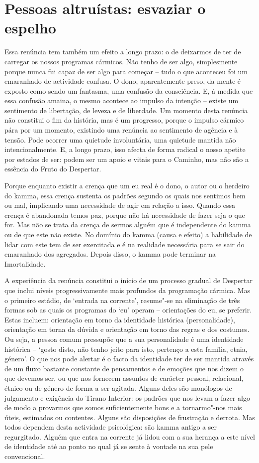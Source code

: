 \section{Pessoas altruístas: esvaziar o espelho}

Essa renúncia tem também um efeito a longo prazo: o de deixarmos de ter de carregar os nossos programas cármicos. Não tenho de ser algo, simplesmente porque nunca fui capaz de ser algo para começar -- tudo o que aconteceu foi um emaranhado de actividade confusa. O dono, aparentemente preso, da mente é exposto como sendo um fantasma, uma confusão da consciência. E, à medida que essa confusão amaina, o mesmo acontece ao impulso da intenção -- existe um sentimento de libertação, de leveza e de liberdade. Um momento desta renúncia não constitui o fim da história, mas é um progresso, porque o impulso cármico pára por um momento, existindo uma renúncia ao sentimento de agência e à tensão. Pode ocorrer uma quietude involuntária, uma quietude mantida não intencionalmente. E, a longo prazo, isso afecta de forma radical o nosso apetite por estados de ser: podem ser um apoio e vitais para o Caminho, mas não são a essência do Fruto do Despertar.

Porque enquanto existir a crença que um eu real é o dono, o autor ou o herdeiro do kamma, essa crença sustenta os padrões segundo os quais nos sentimos bem ou mal, implicando uma necessidade de agir em relação a isso. Quando essa crença é abandonada temos paz, porque não há necessidade de fazer seja o que for. Mas não se trata da crença de sermos alguém que é independente do kamma ou de que este não existe. No domínio do kamma (causa e efeito) a habilidade de lidar com este tem de ser exercitada e é na realidade necessária para se sair do emaranhado dos agregados. Depois disso, o kamma pode terminar na Imortalidade.

A experiência da renúncia constitui o início de um processo gradual de Despertar que inclui níveis progressivamente mais profundos da programação cármica. Mas o primeiro estádio, de `entrada na corrente', resume"-se na eliminação de três formas sob as quais os programas do `eu' operam -- orientações do eu, se preferir. Estas incluem: orientação em torno da identidade histórica (personalidade), orientação em torna da dúvida e orientação em torno das regras e dos costumes. Ou seja, a pessoa comum pressupõe que a sua personalidade é uma identidade histórica -- `gosto disto, não tenho jeito para isto, pertenço a esta família, etnia, género'. O que nos pode alertar é o facto da identidade ter de ser mantida através de um fluxo bastante constante de pensamentos e de emoções que nos dizem o que devemos ser, ou que nos fornecem assuntos de carácter pessoal, relacional, étnico ou de género de forma a ser agitada. Alguns deles são monólogos de julgamento e exigência do Tirano Interior: os padrões que nos levam a fazer algo de modo a provarmos que somos suficientemente bons e a tornarmo"-nos mais úteis, estimados ou contentes. Alguns são disposições de frustração e derrota. Mas todos dependem desta actividade psicológica: são kamma antigo a ser regurgitado. Alguém que entra na corrente já lidou com a sua herança a este nível de identidade até ao ponto no qual já se sente à vontade na sua pele convencional.

